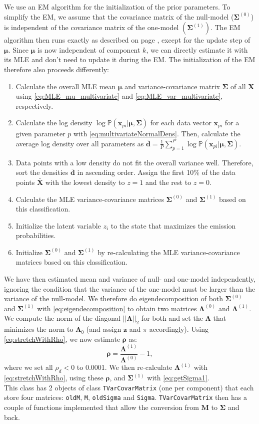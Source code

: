 \documentclass[a4paper,11pt]{article}
\def\M{\boldsymbol{M}}
\def\X{\boldsymbol{X}}
\def\x{\boldsymbol{x}}
\def\z{\boldsymbol{z}}
\def\bmu{\boldsymbol{\mu}}
\def\brho{\boldsymbol{\rho}}
\def\bSigma{\boldsymbol{\Sigma}}
\def\bLambda{\boldsymbol{\Lambda}}
\def\p{\mathbb{P}}
\newcommand{\class}[1]{\texttt{#1}}
\newcommand{\privparam}[1]{\texttt{\textunderscore #1}}
\begin{document}
We use an EM algorithm for the initialization of the prior parameters. To simplify the EM, we assume that the covariance matrix of the null-model ($\bSigma^{(0)}$) is independent of the covariance matrix of the one-model $(\bSigma^{(1)})$. The EM algorithm then runs exactly as described on page \pageref{pg:EM_multivariate}, except for the update step of $\bmu$. Since $\bmu$ is now independent of component $k$, we can directly estimate it with its MLE and don't need to update it during the EM. The initialization of the EM therefore also proceeds differently:
\begin{enumerate}
    \item Calculate the overall MLE mean $\bmu$ and variance-covariance matrix $\bSigma$ of all $\X$ using \eqref{eq:MLE_mu_multivariate} and \eqref{eq:MLE_var_multivariate}, respectively.
    \item Calculate the log density $\log \p(\x_{pi}|\bmu, \bSigma)$ for each data vector $\x_{pi}$ for a given parameter $p$ with \eqref{eq:multivariateNormalDens}. Then, calculate the average log density over all parameters as $\bar{\boldsymbol d} = \frac{1}{P}\sum_{p=1}^P \log \p(\x_{pi}|\bmu, \bSigma)$.
    \item Data points with a low density do not fit the overall variance well. Therefore, sort the densities $\bar{\boldsymbol d}$ in ascending order. Assign the first 10\% of the data points $\bar{\X}$ with the lowest density to $z=1$ and the rest to $z=0$.
    \item Calculate the MLE variance-covariance matrices $\bSigma^{(0)}$ and $\bSigma^{(1)}$ based on this classification.
    \item Initialize the latent variable $z_i$ to the state that maximizes the emission probabilities.
    \item Initialize $\bSigma^{(0)}$ and $\bSigma^{(1)}$ by re-calculating the MLE variance-covariance matrices based on this classification.
\end{enumerate}
We have then estimated mean and variance of null- and one-model independently, ignoring the condition that the variance of the one-model must be larger than the variance of the null-model. We therefore do eigendecomposition of both $\bSigma^{(0)}$ and $\bSigma^{(1)}$ with \eqref{eq:eigendecomposition} to obtain two matrices $\bLambda^{(0)}$ and $\bLambda^{(1)}$. We compute the norm of the diagonal $||\bLambda||_2$ for both and set the $\bLambda$ that minimizes the norm to $\bLambda_0$ (and assign $\z$ and $\pi$ accordingly). Using \eqref{eq:stretchWithRho}, we now estimate $\brho$ as:
\begin{equation*}
 \brho = \frac{\bLambda^{(1)}}{\bLambda^{(0)}} - 1,
\end{equation*}
where we set all $\rho_d < 0$ to 0.0001. We then re-calculate $\bLambda^{(1)}$ with \eqref{eq:stretchWithRho}, using these $\brho$, and $\bSigma^{(1)}$ with \eqref{eq:getSigma1}.\\
This class has 2 objects of class \class{TVarCovarMatrix} (one per component) that each store four matrices: \privparam{oldM},  \privparam{M}, \privparam{oldSigma} and \privparam{Sigma}. \class{TVarCovarMatrix} then has a couple of functions implemented that allow the conversion from $\M$ to $\bSigma$ and back.
\end{document}
